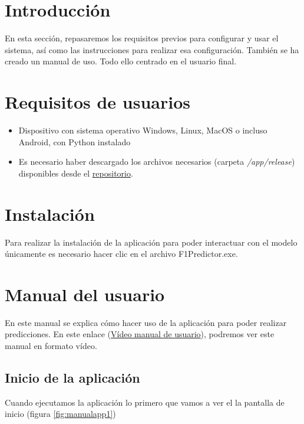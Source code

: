 
\section{Introducción}

En esta sección, repasaremos los requisitos previos para configurar y usar el sistema, así como las instrucciones para realizar esa configuración. También se ha creado un manual de uso. Todo ello centrado en el usuario final.

\section{Requisitos de usuarios}

\begin{itemize}
\item Dispositivo con sistema operativo Windows, Linux, MacOS o incluso Android, con Python instalado
\item Es necesario haber descargado los archivos necesarios (carpeta \textit{/app/release}) disponibles desde el \href{https://github.com/fmv1001/F1RacePredictor/tree/main/app/release}{repositorio}.
\end{itemize}

\section{Instalación}

Para realizar la instalación de la aplicación para poder interactuar con el modelo únicamente es necesario hacer clic en el archivo F1Predictor.exe.

\section{Manual del usuario}

En este manual se explica cómo hacer uso de la aplicación para poder realizar predicciones.
En este enlace (\href{https://youtu.be/rLXteMbnrWw}{Vídeo manual de usuario}), podremos ver este manual en formato vídeo.

\subsection{Inicio de la aplicación}

Cuando ejecutamos la aplicación lo primero que vamos a ver el la pantalla de inicio (figura \ref{fig:manualapp1})

